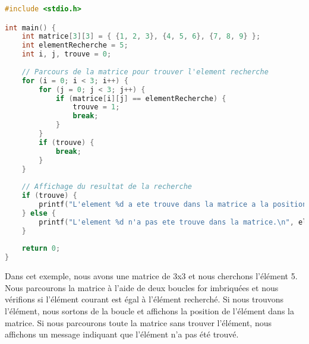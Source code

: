 \documentclass{uofa-eng-assignment}
\begin{document}
\begin{lstlisting}[language=c]
#include <stdio.h>

int main() {
    int matrice[3][3] = { {1, 2, 3}, {4, 5, 6}, {7, 8, 9} };
    int elementRecherche = 5;
    int i, j, trouve = 0;
    
    // Parcours de la matrice pour trouver l'element recherche
    for (i = 0; i < 3; i++) {
        for (j = 0; j < 3; j++) {
            if (matrice[i][j] == elementRecherche) {
                trouve = 1;
                break;
            }
        }
        if (trouve) {
            break;
        }
    }
    
    // Affichage du resultat de la recherche
    if (trouve) {
        printf("L'element %d a ete trouve dans la matrice a la position (%d, %d).\n", elementRecherche, i, j);
    } else {
        printf("L'element %d n'a pas ete trouve dans la matrice.\n", elementRecherche);
    }
    
    return 0;
}
\end{lstlisting}

\noindent \newline
Dans cet exemple, nous avons une matrice de 3x3 et nous cherchons l'élément 5. Nous parcourons la matrice à l'aide de deux boucles for imbriquées et nous vérifions si l'élément courant est égal à l'élément recherché. Si nous trouvons l'élément, nous sortons de la boucle et affichons la position de l'élément dans la matrice. Si nous parcourons toute la matrice sans trouver l'élément, nous affichons un message indiquant que l'élément n'a pas été trouvé.
\end{document}
